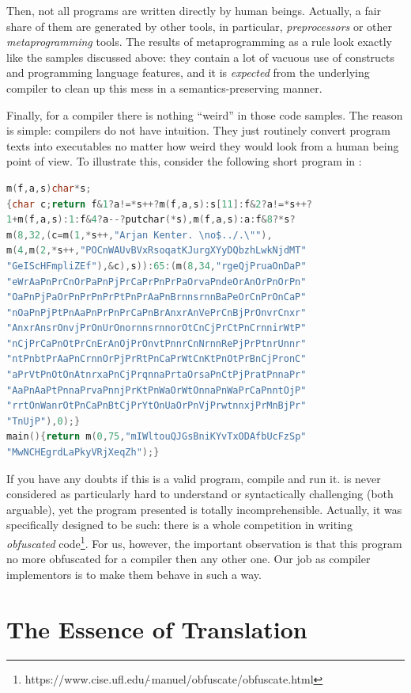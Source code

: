 Then, not all programs are written directly by human beings. Actually, a fair share of them are generated by other tools, in particular, \emph{preprocessors}
or other \emph{metaprogramming} tools. The results of metaprogramming as a rule look exactly like the samples discussed above: they contain a lot
of vacuous use of constructs and programming language features, and it is \emph{expected} from the underlying compiler to clean up this mess
in a semantics-preserving manner.

Finally, for a compiler there is nothing ``weird'' in those code samples. The reason is simple: compilers do not have intuition. They just
routinely convert program texts into executables no matter how weird they would look from a human being point of view. To illustrate this,
consider the following short program in :

\begin{lstlisting}[language=cc]
m(f,a,s)char*s;
{char c;return f&1?a!=*s++?m(f,a,s):s[11]:f&2?a!=*s++?
1+m(f,a,s):1:f&4?a--?putchar(*s),m(f,a,s):a:f&8?*s?
m(8,32,(c=m(1,*s++,"Arjan Kenter. \no$../.\""),
m(4,m(2,*s++,"POCnWAUvBVxRsoqatKJurgXYyDQbzhLwkNjdMT"
"GeIScHFmpliZEf"),&c),s)):65:(m(8,34,"rgeQjPruaOnDaP"
"eWrAaPnPrCnOrPaPnPjPrCaPrPnPrPaOrvaPndeOrAnOrPnOrPn"
"OaPnPjPaOrPnPrPnPrPtPnPrAaPnBrnnsrnnBaPeOrCnPrOnCaP"
"nOaPnPjPtPnAaPnPrPnPrCaPnBrAnxrAnVePrCnBjPrOnvrCnxr"
"AnxrAnsrOnvjPrOnUrOnornnsrnnorOtCnCjPrCtPnCrnnirWtP"
"nCjPrCaPnOtPrCnErAnOjPrOnvtPnnrCnNrnnRePjPrPtnrUnnr"
"ntPnbtPrAaPnCrnnOrPjPrRtPnCaPrWtCnKtPnOtPrBnCjPronC"
"aPrVtPnOtOnAtnrxaPnCjPrqnnaPrtaOrsaPnCtPjPratPnnaPr"
"AaPnAaPtPnnaPrvaPnnjPrKtPnWaOrWtOnnaPnWaPrCaPnntOjP"
"rrtOnWanrOtPnCaPnBtCjPrYtOnUaOrPnVjPrwtnnxjPrMnBjPr"
"TnUjP"),0);}
main(){return m(0,75,"mIWltouQJGsBniKYvTxODAfbUcFzSp"
"MwNCHEgrdLaPkyVRjXeqZh");}
\end{lstlisting}

If you have any doubts if this is a valid  program, compile and run it.  is never considered as particularly hard to
understand or syntactically challenging (both arguable), yet the program presented is totally incomprehensible. Actually, it
was specifically designed to be such: there is a whole competition in writing \emph{obfuscated}
code\footnote{https://www.cise.ufl.edu/$\tilde\,$manuel/obfuscate/obfuscate.html}. For us, however, the important observation is that this
program no more obfuscated for a compiler then any other one. Our job as compiler implementors is to make them behave in such a way.


\section{The Essence of Translation}

